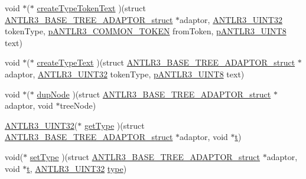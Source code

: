 \begin{DoxyCompactItemize}
\item 
void $\ast$($\ast$ \hyperlink{struct_a_n_t_l_r3___b_a_s_e___t_r_e_e___a_d_a_p_t_o_r__struct_a63f538d18902231cbfc7eb48f0697c64}{create\-Type\-Token\-Text} )(struct \hyperlink{struct_a_n_t_l_r3___b_a_s_e___t_r_e_e___a_d_a_p_t_o_r__struct}{A\-N\-T\-L\-R3\-\_\-\-B\-A\-S\-E\-\_\-\-T\-R\-E\-E\-\_\-\-A\-D\-A\-P\-T\-O\-R\-\_\-struct} $\ast$adaptor, \hyperlink{antlr3defs_8h_ac41f744abd0fd25144b9eb9d11b1dfd1}{A\-N\-T\-L\-R3\-\_\-\-U\-I\-N\-T32} token\-Type, \hyperlink{antlr3interfaces_8h_adaa6df9cbf0cd7ab37fd545520ff299b}{p\-A\-N\-T\-L\-R3\-\_\-\-C\-O\-M\-M\-O\-N\-\_\-\-T\-O\-K\-E\-N} from\-Token, \hyperlink{antlr3defs_8h_a95c800abcac5d607fd9e3e775ace78c5}{p\-A\-N\-T\-L\-R3\-\_\-\-U\-I\-N\-T8} text)
\item 
void $\ast$($\ast$ \hyperlink{struct_a_n_t_l_r3___b_a_s_e___t_r_e_e___a_d_a_p_t_o_r__struct_a077960ee52c93d80db6f926322f875dc}{create\-Type\-Text} )(struct \hyperlink{struct_a_n_t_l_r3___b_a_s_e___t_r_e_e___a_d_a_p_t_o_r__struct}{A\-N\-T\-L\-R3\-\_\-\-B\-A\-S\-E\-\_\-\-T\-R\-E\-E\-\_\-\-A\-D\-A\-P\-T\-O\-R\-\_\-struct} $\ast$adaptor, \hyperlink{antlr3defs_8h_ac41f744abd0fd25144b9eb9d11b1dfd1}{A\-N\-T\-L\-R3\-\_\-\-U\-I\-N\-T32} token\-Type, \hyperlink{antlr3defs_8h_a95c800abcac5d607fd9e3e775ace78c5}{p\-A\-N\-T\-L\-R3\-\_\-\-U\-I\-N\-T8} text)
\item 
void $\ast$($\ast$ \hyperlink{struct_a_n_t_l_r3___b_a_s_e___t_r_e_e___a_d_a_p_t_o_r__struct_acf27d8e1b968febb15630345961af373}{dup\-Node} )(struct \hyperlink{struct_a_n_t_l_r3___b_a_s_e___t_r_e_e___a_d_a_p_t_o_r__struct}{A\-N\-T\-L\-R3\-\_\-\-B\-A\-S\-E\-\_\-\-T\-R\-E\-E\-\_\-\-A\-D\-A\-P\-T\-O\-R\-\_\-struct} $\ast$adaptor, void $\ast$tree\-Node)
\item 
\hyperlink{antlr3defs_8h_ac41f744abd0fd25144b9eb9d11b1dfd1}{A\-N\-T\-L\-R3\-\_\-\-U\-I\-N\-T32}($\ast$ \hyperlink{struct_a_n_t_l_r3___b_a_s_e___t_r_e_e___a_d_a_p_t_o_r__struct_a0c85826933b82373e626328a67ad2c76}{get\-Type} )(struct \hyperlink{struct_a_n_t_l_r3___b_a_s_e___t_r_e_e___a_d_a_p_t_o_r__struct}{A\-N\-T\-L\-R3\-\_\-\-B\-A\-S\-E\-\_\-\-T\-R\-E\-E\-\_\-\-A\-D\-A\-P\-T\-O\-R\-\_\-struct} $\ast$adaptor, void $\ast$\hyperlink{showimage_8m_ad941f6ef920fbfb3d75b60ddbedbdd39}{t})
\item 
void($\ast$ \hyperlink{struct_a_n_t_l_r3___b_a_s_e___t_r_e_e___a_d_a_p_t_o_r__struct_a6c10c8802ca601ac8f707ab0de5ff795}{set\-Type} )(struct \hyperlink{struct_a_n_t_l_r3___b_a_s_e___t_r_e_e___a_d_a_p_t_o_r__struct}{A\-N\-T\-L\-R3\-\_\-\-B\-A\-S\-E\-\_\-\-T\-R\-E\-E\-\_\-\-A\-D\-A\-P\-T\-O\-R\-\_\-struct} $\ast$adaptor, void $\ast$\hyperlink{showimage_8m_ad941f6ef920fbfb3d75b60ddbedbdd39}{t}, \hyperlink{antlr3defs_8h_ac41f744abd0fd25144b9eb9d11b1dfd1}{A\-N\-T\-L\-R3\-\_\-\-U\-I\-N\-T32} \hyperlink{convert2cfg_8m_a2902a7a983ab04c79cae2162ad553481}{type})

\end{DoxyCompactItemize}
